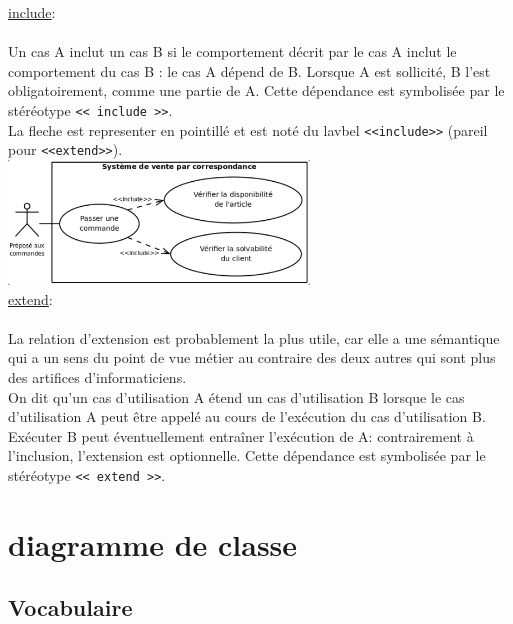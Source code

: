 \documentclass[a4paper,12pt,openany]{book}
\begin{document}
\underline{include}:\\
\\
Un cas A inclut un cas B si le comportement décrit par le cas A inclut le comportement du cas B : le cas A dépend de B. Lorsque A est sollicité, B l'est obligatoirement, comme une partie de A. Cette dépendance est symbolisée par le stéréotype \verb+<< include >>+.\\
La fleche est representer en pointillé et est noté du lavbel \verb+<<include>>+ (pareil pour \verb+<<extend>>+).\\

\includegraphics[width=0.60\textwidth,center]{img/include_relation.png}
\\

\underline{extend}:\\
\\
La relation d'extension est probablement la plus utile, car elle a une sémantique qui a un sens du point de vue métier au contraire des deux autres qui sont plus des artifices d'informaticiens.\\
On dit qu'un cas d'utilisation A étend un cas d'utilisation B lorsque le cas d'utilisation A peut être appelé au cours de l'exécution du cas d'utilisation B.\\
Exécuter B peut éventuellement entraîner l'exécution de A: contrairement à l'inclusion, l'extension est optionnelle. Cette dépendance est symbolisée par le stéréotype \verb+<< extend >>+.\\


\section{diagramme de classe}

\subsection{Vocabulaire}
\end{document}
